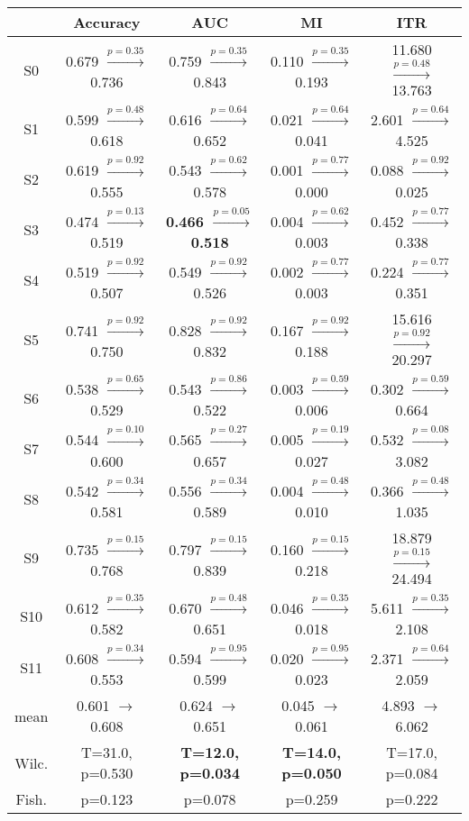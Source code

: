 \begin{tabular}{c c c c c}
\toprule
 & Accuracy & AUC & MI & ITR\\
\midrule
S0 &  0.679 $\xrightarrow{p=0.35}$  0.736 &  0.759 $\xrightarrow{p=0.35}$  0.843 &  0.110 $\xrightarrow{p=0.35}$  0.193 & 11.680 $\xrightarrow{p=0.48}$ 13.763\\
S1 &  0.599 $\xrightarrow{p=0.48}$  0.618 &  0.616 $\xrightarrow{p=0.64}$  0.652 &  0.021 $\xrightarrow{p=0.64}$  0.041 &  2.601 $\xrightarrow{p=0.64}$  4.525\\
S2 &  0.619 $\xrightarrow{p=0.92}$  0.555 &  0.543 $\xrightarrow{p=0.62}$  0.578 &  0.001 $\xrightarrow{p=0.77}$  0.000 &  0.088 $\xrightarrow{p=0.92}$  0.025\\
S3 &  0.474 $\xrightarrow{p=0.13}$  0.519 & \textbf{ 0.466 $\xrightarrow{p=0.05}$  0.518} &  0.004 $\xrightarrow{p=0.62}$  0.003 &  0.452 $\xrightarrow{p=0.77}$  0.338\\
S4 &  0.519 $\xrightarrow{p=0.92}$  0.507 &  0.549 $\xrightarrow{p=0.92}$  0.526 &  0.002 $\xrightarrow{p=0.77}$  0.003 &  0.224 $\xrightarrow{p=0.77}$  0.351\\
S5 &  0.741 $\xrightarrow{p=0.92}$  0.750 &  0.828 $\xrightarrow{p=0.92}$  0.832 &  0.167 $\xrightarrow{p=0.92}$  0.188 & 15.616 $\xrightarrow{p=0.92}$ 20.297\\
S6 &  0.538 $\xrightarrow{p=0.65}$  0.529 &  0.543 $\xrightarrow{p=0.86}$  0.522 &  0.003 $\xrightarrow{p=0.59}$  0.006 &  0.302 $\xrightarrow{p=0.59}$  0.664\\
S7 &  0.544 $\xrightarrow{p=0.10}$  0.600 &  0.565 $\xrightarrow{p=0.27}$  0.657 &  0.005 $\xrightarrow{p=0.19}$  0.027 &  0.532 $\xrightarrow{p=0.08}$  3.082\\
S8 &  0.542 $\xrightarrow{p=0.34}$  0.581 &  0.556 $\xrightarrow{p=0.34}$  0.589 &  0.004 $\xrightarrow{p=0.48}$  0.010 &  0.366 $\xrightarrow{p=0.48}$  1.035\\
S9 &  0.735 $\xrightarrow{p=0.15}$  0.768 &  0.797 $\xrightarrow{p=0.15}$  0.839 &  0.160 $\xrightarrow{p=0.15}$  0.218 & 18.879 $\xrightarrow{p=0.15}$ 24.494\\
S10 &  0.612 $\xrightarrow{p=0.35}$  0.582 &  0.670 $\xrightarrow{p=0.48}$  0.651 &  0.046 $\xrightarrow{p=0.35}$  0.018 &  5.611 $\xrightarrow{p=0.35}$  2.108\\
S11 &  0.608 $\xrightarrow{p=0.34}$  0.553 &  0.594 $\xrightarrow{p=0.95}$  0.599 &  0.020 $\xrightarrow{p=0.95}$  0.023 &  2.371 $\xrightarrow{p=0.64}$  2.059\\
\midrule
mean & 0.601 $\rightarrow$ 0.608 & 0.624 $\rightarrow$ 0.651 & 0.045 $\rightarrow$ 0.061 & 4.893 $\rightarrow$ 6.062\\
Wilc. & T=31.0, p=0.530 & \textbf{T=12.0, p=0.034} & \textbf{T=14.0, p=0.050} & T=17.0, p=0.084\\
Fish. & p=0.123 & p=0.078 & p=0.259 & p=0.222\\
\bottomrule
\end{tabular}
